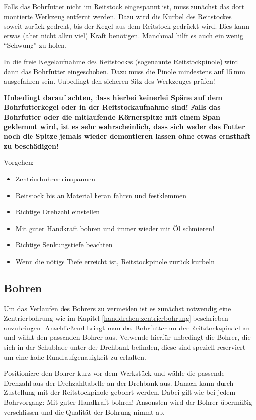 \documentclass{\basedir/fablab-document}
\begin{document}
Falls das Bohrfutter nicht im Reitstock eingespannt ist, muss zunächst das dort montierte Werkzeug entfernt werden.
Dazu wird die Kurbel des Reitstockes soweit zurück gedreht, bis der  Kegel aus dem Reitstock gedrückt wird.
Dies kann etwas (aber nicht allzu viel) Kraft benötigen.
Manchmal hilft es auch ein wenig \enquote{Schwung} zu holen.

In die freie Kegelaufnahme des Reitstockes (sogenannte Reitstockpinole) wird dann das Bohrfutter eingeschoben.
Dazu muss die Pinole mindestens auf 15\,mm ausgefahren sein.
Unbedingt den sicheren Sitz des Werkzeuges prüfen!

\textbf{Unbedingt darauf achten, dass hierbei keinerlei Späne auf dem Bohrfutterkegel oder in der Reitstockaufnahme sind! Falls das Bohrfutter oder die mitlaufende Körnerspitze mit einem Span geklemmt wird, ist es sehr wahrscheinlich, dass sich weder das Futter noch die Spitze jemals wieder demontieren lassen ohne etwas ernsthaft zu beschädigen!}

Vorgehen:
\begin{itemize}
\item Zentrierbohrer einspannen
\item Reitstock bis an Material heran fahren und festklemmen
\item Richtige Drehzahl einstellen
\item Mit guter Handkraft bohren und immer wieder mit Öl schmieren!
\item Richtige Senkungstiefe beachten
\item Wenn die nötige Tiefe erreicht ist, Reitstockpinole zurück kurbeln

\end{itemize}

\subsection{Bohren}

Um das Verlaufen des Bohrers zu vermeiden ist es zunächst notwendig eine Zentrierbohrung wie im Kapitel \ref{handdrehen:zentrierbohrung} beschrieben anzubringen.
Anschließend bringt man das Bohrfutter an der Reitstockspindel an und wählt den passenden Bohrer aus.
Verwende hierfür unbedingt die Bohrer, die sich in der Schublade unter der Drehbank befinden, diese sind speziell reserviert um eine hohe Rundlaufgenauigkeit zu erhalten.

Positioniere den Bohrer kurz vor dem Werkstück und wähle die passende Drehzahl aus der Drehzahltabelle an der Drehbank aus.
Danach kann durch Zustellung mit der Reitstockpinole gebohrt werden.
Dabei gilt wie bei jedem Bohrvorgang: Mit guter Handkraft bohren!
Ansonsten wird der Bohrer übermäßig verschlissen und die Qualität der Bohrung nimmt ab.
\end{document}
